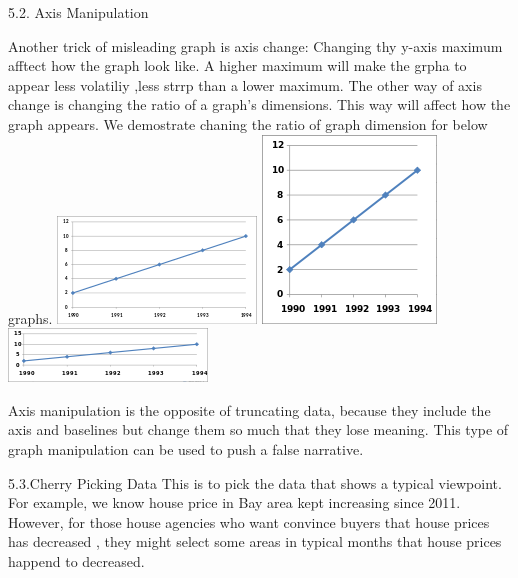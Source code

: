 \documentclass[]{book}
\theoremstyle{definition}
\theoremstyle{definition}
\theoremstyle{definition}
\theoremstyle{remark}
\begin{document}
5.2. Axis Manipulation

Another trick of misleading graph is axis change: Changing thy y-axis
maximum afftect how the graph look like. A higher maximum will make the
grpha to appear less volatiliy ,less strrp than a lower maximum. The
other way of axis change is changing the ratio of a graph's dimensions.
This way will affect how the graph appears. We demostrate chaning the
ratio of graph dimension for below graphs.
\includegraphics{images/Line_graph1.svg.png}
\includegraphics{images/175px-Line_graph1-3.svg.png}
\includegraphics{images/200px-Line_graph1-4.svg.png}

Axis manipulation is the opposite of truncating data, because they
include the axis and baselines but change them so much that they lose
meaning. This type of graph manipulation can be used to push a false
narrative.

5.3.Cherry Picking Data This is to pick the data that shows a typical
viewpoint. For example, we know house price in Bay area kept increasing
since 2011. However, for those house agencies who want convince buyers
that house prices has decreased , they might select some areas in
typical months that house prices happend to decreased.
\end{document}
